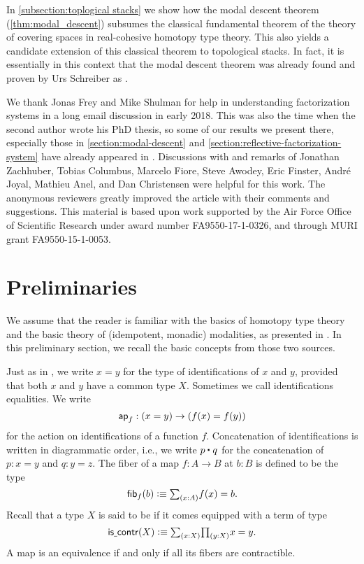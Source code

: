 \documentclass[9pt,twosided]{amsart}
\begin{document}
In \cref{subsection:toplogical stacks} we show how the modal descent theorem (\cref{thm:modal_descent})
subsumes the classical fundamental theorem of the theory of covering spaces in real-cohesive homotopy type theory.
This also yields a candidate extension of this classical theorem to topological stacks.
In fact, it is essentially in this context that the modal descent theorem was already found and proven by Urs Schreiber as \cite[Proposition 5.2.42]{SchreiberDcct}.
  
We thank Jonas Frey and Mike Shulman for help in understanding factorization systems in a long email discussion in early 2018. This was also the time when the second author wrote his PhD thesis, so some of our results we present there, especially those in \cref{section:modal-descent} and \cref{section:reflective-factorization-system} have already appeared in \cite{rijke-phd}.
Discussions with and remarks of Jonathan Zachhuber, Tobias Columbus, Marcelo Fiore, Steve Awodey, Eric Finster, André Joyal, Mathieu Anel, and Dan Christensen were helpful for this work.
The anonymous reviewers greatly improved the article with their comments and suggestions. 
This material is based upon work supported by the Air Force Office of Scientific Research under award number FA9550-17-1-0326, and through MURI grant FA9550-15-1-0053.


\section{Preliminaries}
We assume that the reader is familiar with the basics of homotopy type theory \cite{UFP} and the basic theory of (idempotent, monadic) modalities, as presented in \cite{RijkeSpittersShulman}. In this preliminary section, we recall the basic concepts from those two sources.

Just as in \cite{UFP}, we write $x=y$ for the type of identifications of $x$ and $y$, provided that both $x$ and $y$ have a common type $X$. Sometimes we call identifications equalities. We write
\begin{equation*}
  \mathsf{ap}_{f}:(x=y)\to (f(x)=f(y))
\end{equation*}
for the action on identifications of a function $f$. Concatenation of identifications is written in diagrammatic order, i.e., we write $\ct{p}{q}$ for the concatenation of $p:x=y$ and $q:y=z$. The fiber of a map $f:A\to B$ at $b:B$ is defined to be the type
\begin{equation*}
  \fib{f}{b}\defeq \sm{x:A}f(x)=b.
\end{equation*}
Recall that a type $X$ is said to be  if it comes equipped with a term of type
\begin{equation*}
  \iscontr(X)\defeq \sm{x:X}\prd{y:X}x=y.
\end{equation*}
A map is an equivalence if and only if all its fibers are contractible.
\end{document}
